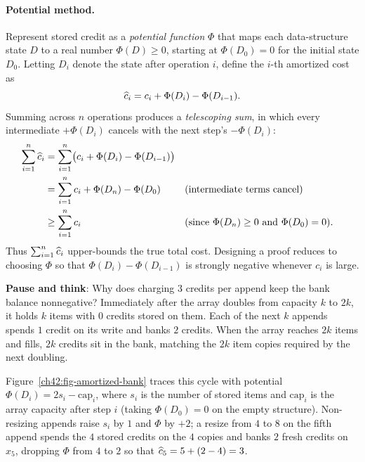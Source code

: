 \paragraph{Potential method.} Represent stored credit as a \emph{potential function} $\Phi$ that maps each data-structure state $D$ to a real number $\Phi(D) \ge 0$, starting at $\Phi(D_0) = 0$ for the initial state $D_0$. Letting $D_i$ denote the state after operation $i$, define the $i$-th amortized cost as
\[
  \widehat{c}_i = c_i + \Phi(D_i) - \Phi(D_{i-1}).
\]
Summing across $n$ operations produces a \emph{telescoping sum}, in which every intermediate $+\Phi(D_i)$ cancels with the next step's $-\Phi(D_i)$:
\begin{align*}
  \sum_{i=1}^n \widehat{c}_i
  &= \sum_{i=1}^n \bigl(c_i + \Phi(D_i) - \Phi(D_{i-1})\bigr) \\
  &= \sum_{i=1}^n c_i + \Phi(D_n) - \Phi(D_0) && \text{(intermediate terms cancel)} \\
  &\ge \sum_{i=1}^n c_i && \text{(since $\Phi(D_n) \ge 0$ and $\Phi(D_0) = 0$).}
\end{align*}
Thus $\sum_{i=1}^n \widehat{c}_i$ upper-bounds the true total cost. Designing a proof reduces to choosing $\Phi$ so that $\Phi(D_i) - \Phi(D_{i-1})$ is strongly negative whenever $c_i$ is large.

\begin{recoverybox}
\textbf{Pause and think}: Why does charging $3$ credits per append keep the bank balance nonnegative? Immediately after the array doubles from capacity $k$ to $2k$, it holds $k$ items with $0$ credits stored on them. Each of the next $k$ appends spends $1$ credit on its write and banks $2$ credits. When the array reaches $2k$ items and fills, $2k$ credits sit in the bank, matching the $2k$ item copies required by the next doubling.
\end{recoverybox}

Figure~\ref{ch42:fig-amortized-bank} traces this cycle with potential $\Phi(D_i) = 2 s_i - \text{cap}_i$, where $s_i$ is the number of stored items and $\text{cap}_i$ is the array capacity after step $i$ (taking $\Phi(D_0) = 0$ on the empty structure). Non-resizing appends raise $s_i$ by $1$ and $\Phi$ by $+2$; a resize from $4$ to $8$ on the fifth append spends the $4$ stored credits on the $4$ copies and banks $2$ fresh credits on $x_5$, dropping $\Phi$ from $4$ to $2$ so that $\widehat{c}_5 = 5 + (2 - 4) = 3$.

